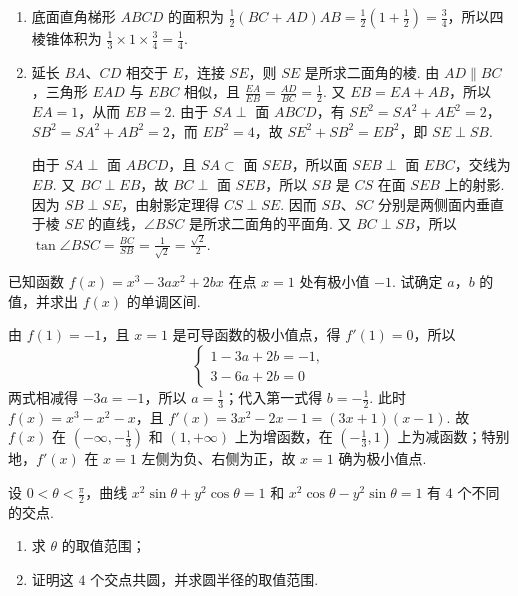 \begin{solution}
\begin{enumerate}
\item 底面直角梯形 \(ABCD\) 的面积为 \(\frac12(BC+AD)AB=\frac12\left(1+\frac12\right)=\frac34\)，所以四棱锥体积为 \(\frac13\times1\times\frac34=\frac14\).

\item 延长 \(BA\)、\(CD\) 相交于 \(E\)，连接 \(SE\)，则 \(SE\) 是所求二面角的棱. 由 \(AD\parallel BC\)，三角形 \(EAD\) 与 \(EBC\) 相似，且 \(\frac{EA}{EB}=\frac{AD}{BC}=\frac12\). 又 \(EB=EA+AB\)，所以 \(EA=1\)，从而 \(EB=2\). 由于 \(SA\perp\) 面 \(ABCD\)，有 \(SE^2=SA^2+AE^2=2\)，\(SB^2=SA^2+AB^2=2\)，而 \(EB^2=4\)，故 \(SE^2+SB^2=EB^2\)，即 \(SE\perp SB\).

由于 \(SA\perp\) 面 \(ABCD\)，且 \(SA\subset\) 面 \(SEB\)，所以面 \(SEB\perp\) 面 \(EBC\)，交线为 \(EB\). 又 \(BC\perp EB\)，故 \(BC\perp\) 面 \(SEB\)，所以 \(SB\) 是 \(CS\) 在面 \(SEB\) 上的射影. 因为 \(SB\perp SE\)，由射影定理得 \(CS\perp SE\). 因而 \(SB\)、\(SC\) 分别是两侧面内垂直于棱 \(SE\) 的直线，\(\angle BSC\) 是所求二面角的平面角. 又 \(BC\perp SB\)，所以 \(\tan\angle BSC=\frac{BC}{SB}=\frac{1}{\sqrt2}=\frac{\sqrt2}{2}\).
\end{enumerate}
\end{solution}

\begin{problem}
已知函数 \(f(x) = x^3 - 3ax^2 + 2bx\) 在点 \(x = 1\) 处有极小值 \(-1\). 试确定 \(a\)，\(b\) 的值，并求出 \(f(x)\) 的单调区间.
\end{problem}

\begin{solution}
由 \(f(1)=-1\)，且 \(x=1\) 是可导函数的极小值点，得 \(f'(1)=0\)，所以
\[
\begin{cases}
1-3a+2b=-1,\\
3-6a+2b=0
\end{cases}
\]
两式相减得 \(-3a=-1\)，所以 \(a=\frac13\)；代入第一式得 \(b=-\frac12\). 此时 \(f(x)=x^3-x^2-x\)，且 \(f'(x)=3x^2-2x-1=(3x+1)(x-1)\).
故 \(f(x)\) 在 \((-\infty,-\frac13)\) 和 \((1,+\infty)\) 上为增函数，在 \((-\frac13,1)\) 上为减函数；特别地，\(f'(x)\) 在 \(x=1\) 左侧为负、右侧为正，故 \(x=1\) 确为极小值点.
\end{solution}

\begin{problem}
设 \(0 < \theta < \frac{\pi}{2}\)，曲线 \(x^2\sin\theta + y^2\cos\theta = 1\) 和 \(x^2\cos\theta - y^2\sin\theta = 1\) 有 \(4\) 个不同的交点.

\begin{enumerate}
\item 求 \(\theta\) 的取值范围；
\item 证明这 \(4\) 个交点共圆，并求圆半径的取值范围.
\end{enumerate}
\end{problem}

